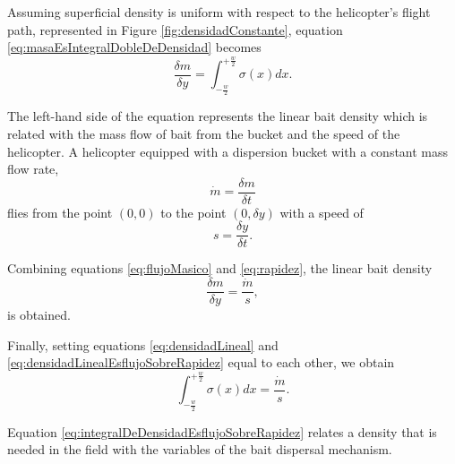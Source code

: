 Assuming superficial density is uniform with respect to the helicopter’s flight
path, represented in Figure \ref{fig:densidadConstante}, equation \eqref{eq:masaEsIntegralDobleDeDensidad} becomes
\begin{equation}
  \frac{\delta m}{\delta y}=\int_{-\frac{w}{2}}^{+\frac{w}{2}}\sigma(x)dx.
  \label{eq:densidadLineal}
\end{equation}

The left-hand side of the equation represents the linear bait density which is
related with the mass flow of bait from the bucket and the speed of the
helicopter.  A helicopter equipped with a dispersion bucket with a constant mass
flow rate,
\begin{equation}
  \dot{m}=\frac{\delta m}{\delta t}
  \label{eq:flujoMasico}
\end{equation}
flies from the point $(0,0)$ to the point $(0,\delta y)$ with a speed of
\begin{equation}
  s=\frac{\delta y}{\delta t}.
  \label{eq:rapidez}
\end{equation}

Combining equations \eqref{eq:flujoMasico} and \eqref{eq:rapidez}, the linear bait
density
\begin{equation}
  \frac{\delta m}{\delta y}=\frac{\dot{m}}{s},
  \label{eq:densidadLinealEsflujoSobreRapidez}
\end{equation}
is obtained.

Finally, setting equations \eqref{eq:densidadLineal} and \eqref{eq:densidadLinealEsflujoSobreRapidez} equal to each other, we obtain
\begin{equation}
  \int_{-\frac{w}{2}}^{+\frac{w}{2}} \sigma(x)dx=\frac{\dot{m}}{s}.
  \label{eq:integralDeDensidadEsflujoSobreRapidez}
\end{equation}

Equation \eqref{eq:integralDeDensidadEsflujoSobreRapidez}  relates a density that is needed in the field with the variables of the bait dispersal mechanism.
